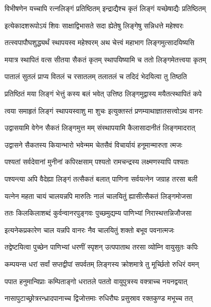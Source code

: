 \twolineshloka
{विभीषणेन यच्चापि रत्नलिङ्गं प्रतिष्ठितम्}
{इन्द्राद्यैश्च कृतं लिङ्गं यच्छेषाद्यैः प्रतिष्ठितम्}%

\twolineshloka
{इत्येकादशरूपोऽयं शिवः साक्षाद्विभासते}
{सदा ह्येतेषु लिङ्गेषु सन्निधत्ते महेश्वरः}%

\twolineshloka
{तत्स्वपापौघशुद्ध्यर्थं स्थापयस्व महेश्वरम्}
{अथ चेत्त्वं महाभाग लिङ्गमुत्सादयिष्यसि}%

\twolineshloka
{मयात्र स्थापितं वत्स सीतया सैकतं कृतम्}
{स्थापयिष्यामि च ततो लिङ्गमेतत्त्वया कृतम्}%

\twolineshloka
{पातालं सुतलं प्राप्य वितलं च रसातलम्}
{तलातलं च तदिदं भेदयित्वा तु तिष्ठति}%

\twolineshloka
{प्रतिष्ठितं मया लिङ्गं भेत्तुं कस्य बलं भवेत्}
{उत्तिष्ठ लिङ्गमुद्वास्य मयैतत्स्थापितं कपे}%

\twolineshloka
{त्वया समाहृतं लिङ्गं स्थापयस्वाशु मा शुचः}
{इत्युक्तस्तं प्रणम्याथाज्ञातसत्त्वोऽथ वानरः}%

\twolineshloka
{उद्वासयामि वेगेन सैकतं लिङ्गमुत्त मम्}
{संस्थापयामि कैलासादानीतं लिङ्गमादरात्}%

\twolineshloka
{उद्वासने सैकतस्य कियान्भारो भवेन्मम}
{चेतसैवं विचार्यायं हनूमान्मारुता त्मजः}%

\twolineshloka
{पश्यतां सर्वदेवानां मुनीनां कपिरक्षसाम्}
{पश्यतो रामचन्द्रस्य लक्ष्मणस्यापि पश्यतः}%

\twolineshloka
{पश्यन्त्या अपि वैदेह्या लिङ्गं तत्सैकतं बलात्}
{पाणिना सर्वयत्नेन जग्राह तरसा बली}%

\twolineshloka
{यत्नेन महता चायं चालयन्नपि मारुतिः}
{नालं चालयितुं ह्यासीत्सैकतं लिङ्गमोजसा}%

\twolineshloka
{ततः किलकिलाशब्दं कुर्वन्वानरपुङ्गवः}
{पुच्छमुद्यम्य पाणिभ्यां निरास्थत्तन्निजौजसा}%

\twolineshloka
{इत्यनेकप्रकारेण चाल यन्नपि वानरः}
{नैव चालयितुं शक्तो बभूव पवनात्मजः}%

\twolineshloka
{तद्वेष्टयित्वा पुच्छेन पाणिभ्यां धरणीं स्पृशन्}
{उत्पपाताथ तरसा व्योम्नि वायुसुतः कपिः}%

\twolineshloka
{कम्पयन्स धरां सर्वां सप्तद्वीपां सपर्वतम्}
{लिङ्गस्य क्रोशमात्रे तु मूर्च्छितो रुधिरं वमन्}%

\twolineshloka
{पपात हनुमान्विप्राः कम्पिताङ्गो धरातले}
{पततो वायुपुत्रस्य वक्त्राच्च नयनद्वयात्}%

\twolineshloka
{नासापुटाच्छ्रोत्ररन्ध्रादपानाच्च द्विजोत्तमाः}
{रुधिरौघः प्रसुस्राव रक्तकुण्ड मभूच्च तत्}%

